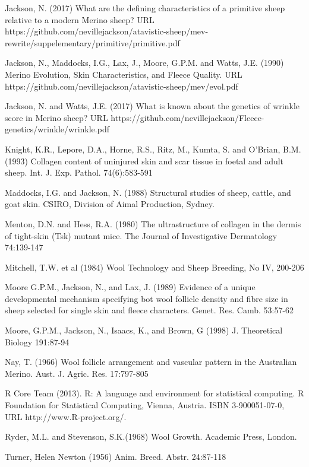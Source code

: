\documentclass[titlepage]{article}  %
\begin{document}
\begin{thebibliography}{99}
Jackson, N. (2017) What are the defining characteristics of a primitive sheep relative to a modern Merino sheep? URL https://github.com/nevillejackson/atavistic-sheep/mev-rewrite/suppelementary/primitive/primitive.pdf

Jackson, N., Maddocks, I.G., Lax, J., Moore, G.P.M. and Watts, J.E. (1990) Merino Evolution, Skin Characteristics, and Fleece Quality. URL https://github.com/nevillejackson/atavistic-sheep/mev/evol.pdf 

Jackson, N. and Watts, J.E. (2017) What is known about the genetics of wrinkle score in Merino sheep? URL https://github.com/nevillejackson/Fleece-genetics/wrinkle/wrinkle.pdf

Knight, K.R., Lepore, D.A., Horne, R.S., Ritz, M., Kumta, S. and O'Brian, B.M. (1993) Collagen content of uninjured skin and scar tissue in foetal and adult sheep. Int. J. Exp. Pathol. 74(6):583-591

Maddocks, I.G. and Jackson, N. (1988) Structural studies of sheep, cattle, and goat skin. CSIRO, Division of Aimal Production, Sydney.

Menton, D.N. and Hess, R.A. (1980) The ultrastructure of collagen in the dermis of tight-skin (Tsk) mutant mice. The Journal of Investigative Dermatology 74:139-147

Mitchell, T.W. et al (1984) Wool Technology and Sheep Breeding, No IV, 200-206

Moore G.P.M., Jackson, N., and Lax, J. (1989) Evidence of a unique developmental mechanism specifying bot wool follicle density and fibre size in sheep selected for single skin and fleece characters. Genet. Res. Camb. 53:57-62

Moore, G.P.M., Jackson, N., Isaacs, K., and Brown, G (1998) J. Theoretical Biology 191:87-94

Nay, T. (1966) Wool follicle arrangement and vascular pattern in the Australian Merino. Aust. J. Agric. Res. 17:797-805

R Core Team (2013). R: A language and environment for statistical
  computing. R Foundation for Statistical Computing, Vienna, Austria.
  ISBN 3-900051-07-0, URL http://www.R-project.org/.

Ryder, M.L. and Stevenson, S.K.(1968) Wool Growth. Academic Press, London.


Turner, Helen Newton (1956) Anim. Breed. Abstr. 24:87-118


\end{thebibliography}
\end{document}

